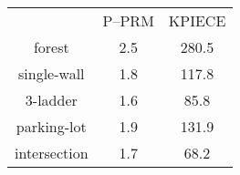 \documentclass{article}
\begin{document}
\begin{tabular}{c c c}
&P--PRM&KPIECE\\
forest&2.5&280.5\\
single-wall&1.8&117.8\\
3-ladder&1.6&85.8\\
parking-lot&1.9&131.9\\
intersection&1.7&68.2\\
\end{tabular}
\end{document}
